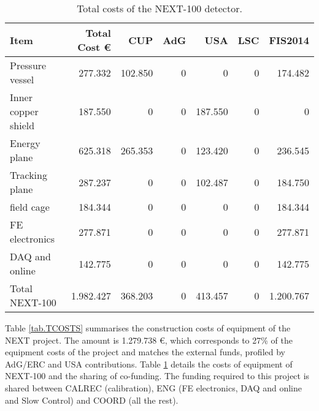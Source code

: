 %
\begin{table}[h!]
\begin{center}
\begin{tabular}{|l|r|r|r|r|r|r|}
\hline
 Item               & Total Cost \euro & CUP	 & AdG & USA     & LSC & FIS2014   \\
 \hline
Pressure vessel     &   277.332        & 102.850 &   0 &       0 &   0 &   174.482 \\ 
Inner copper shield &   187.550        &       0 &   0 & 187.550 &   0 & 	 0 \\ 
Energy plane	    &   625.318        & 265.353 &   0 & 123.420 &   0 &   236.545 \\ 
Tracking plane	    &   287.237        &       0 &   0 & 102.487 &   0 &   184.750 \\ 
field cage	    &   184.344        &       0 &   0 &       0 &   0 &   184.344 \\ 
FE electronics	    &   277.871        &       0 &   0 &       0 &   0 &   277.871 \\
DAQ and online      &   142.775        &       0 &   0 &       0 &   0 &   142.775 \\ 
Total NEXT-100	    & 1.982.427        & 368.203 &   0 & 413.457 &   0 & 1.200.767 \\ 
  \hline
\end{tabular}  
\caption{Total costs of the NEXT-100 detector.}
\label{tab.TN100}
\end{center}
\end{table} 
 
Table \ref{tab.TCOSTS} summarises the construction costs of equipment of the NEXT project. The amount is 1.279.738 \euro, which corresponds to 27\% of the equipment costs of the project and matches the external funds, profiled by AdG/ERC and USA contributions. Table \ref{tab.TN100} details the costs of equipment of NEXT-100 and the sharing of co-funding. The funding required to this project is shared between CALREC (calibration),
ENG (FE electronics, DAQ and online and Slow Control) and COORD (all the rest). 

